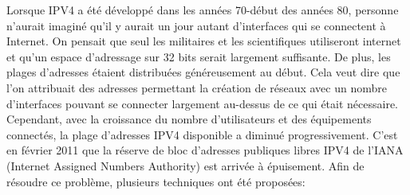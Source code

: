 Lorsque IPV4 a été développé dans les années 70-début des années 80, personne 
n'aurait imaginé qu'il y aurait un jour autant d'interfaces qui se connectent à 
Internet. On pensait que seul les militaires et les scientifiques utiliseront 
internet et qu'un espace d'adressage sur 32 bits serait largement suffisante. 
De plus, les plages d'adresses étaient distribuées généreusement au début. 
Cela veut dire que l'on attribuait des adresses permettant la création de réseaux 
avec un nombre d'interfaces pouvant se connecter largement au-dessus de ce qui était 
nécessaire.
Cependant, avec la croissance du nombre d'utilisateurs et des équipements connectés, 
la plage d'adresses IPV4 disponible a diminué progressivement. C'est en février 2011 
que la réserve de bloc d'adresses publiques libres IPV4 de l'IANA (Internet Assigned 
Numbers Authority) est arrivée à épuisement.
\smallbreak
Afin de résoudre ce problème, plusieurs techniques ont été proposées:
